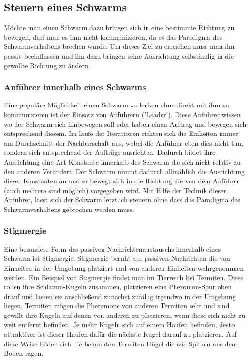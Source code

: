 
\subsection{Steuern eines Schwarms}\label{subsec:SchwarmSteuern}

Möchte man einen Schwarm dazu bringen sich in eine bestimmte Richtung zu bewegen, darf man es ihm nicht kommunizieren, da es das Paradigma des Schwarmverhaltens brechen würde.
Um dieses Ziel zu erreichen muss man ihn passiv beeinflussen und ihn dazu bringen seine Ausrichtung selbständig in die gewollte Richtung zu ändern.

\subsubsection*{Anführer innerhalb eines Schwarms}\label{subsubsec:Anführer}
Eine populäre Möglichkeit einen Schwarm zu lenken ohne direkt mit ihm zu kommunizieren ist der Einsatz von Anführern ('Leader').
Diese Anführer wissen wo der Schwarm sich hinbewegen soll oder haben einen Auftrag und bewegen sich entsprechend diesem.
Im laufe der Iterationen richten sich die Einheiten immer am Durchschnitt der Nachbarschaft aus, wobei die Anführer eben dies nicht tun, sondern sich entsprechend der Aufträge ausrichten.
Dadurch bildet ihre Ausrichtung eine Art Konstante innerhalb des Schwarm die sich nicht relativ zu den anderen Verändert.
Der Schwarm nimmt dadurch allmählich die Ausrichtung dieser Konstanten an und er bewegt sich in die Richtung die von dem Anführer (auch mehrere sind möglich) vorgegeben wird.
Mit Hilfe der Technik dieser Anführer, lässt sich der Schwarm letztlich steuern ohne dass das Paradigma des Schwarmverhaltens gebrochen werden muss.


\subsubsection*{Stigmergie}\label{subsubsec:Stigmergie}

Eine besondere Form des passiven Nachrichtenaustauschs innerhalb eines Schwarm ist Stigmergie.
Stigmergie beruht auf passiven Nachrichten die von Einheiten in der Umgebung platziert und von anderen Einheiten wahrgenommen werden.
Ein Beispiel von Stigmergie findet man im Tierreich bei Termiten.
Diese rollen ihre Schlamm-Kugeln zusammen, platzieren eine Pheromon-Spur oben drauf und lassen sie anschließend zunächst zufällig irgendwo in der Umgebung liegen.
Termiten mögen die Pheromone von anderen Termiten sehr und sind gewillt ihre Kugeln auf denen von anderen zu platzieren, wenn diese sich nicht zu weit entfernt befinden.
Je mehr Kugeln sich auf einem Haufen befinden, desto attraktiver ist dieser Haufen dafür die nächste Kugel darauf zu platzieren.
Auf diese Weise bilden sich die bekannten Termiten-Hügel die wie Spitzen aus dem Boden ragen.

